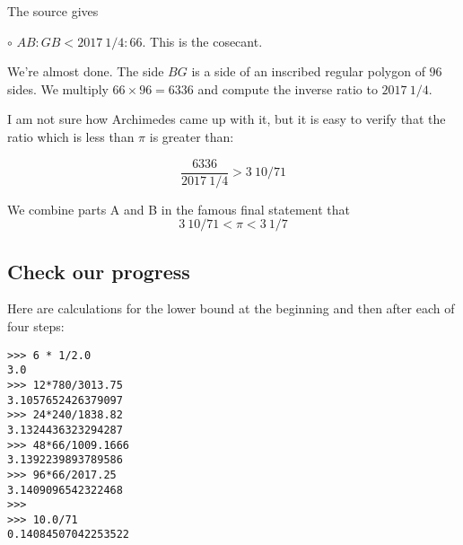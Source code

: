 \documentclass[11pt, oneside]{article}
\begin{document}
The source gives

$\circ$ $AB:GB < 2017 \ 1/4:66$.  This is the cosecant.

We're almost done.  The side $BG$ is a side of an inscribed regular polygon of $96$ sides.  We multiply $66 \times 96 = 6336$ and compute the inverse ratio to $2017\ 1/4$.

I am not sure how Archimedes came up with it, but it is easy to verify that the ratio which is less than $\pi$ is greater than:

\[ \frac{6336}{2017 \ 1/4} > 3 \ 10/71 \]

We combine parts A and B in the famous final statement that
\[ 3 \ 10/71 < \pi < 3 \ 1/7 \]

\subsection*{Check our progress}

Here are calculations for the lower bound at the beginning and then after each of four steps:

\begin{verbatim}
>>> 6 * 1/2.0
3.0
>>> 12*780/3013.75
3.1057652426379097
>>> 24*240/1838.82
3.1324436323294287
>>> 48*66/1009.1666
3.1392239893789586
>>> 96*66/2017.25
3.1409096542322468
>>>
>>> 10.0/71
0.14084507042253522
\end{verbatim}
\end{document}
